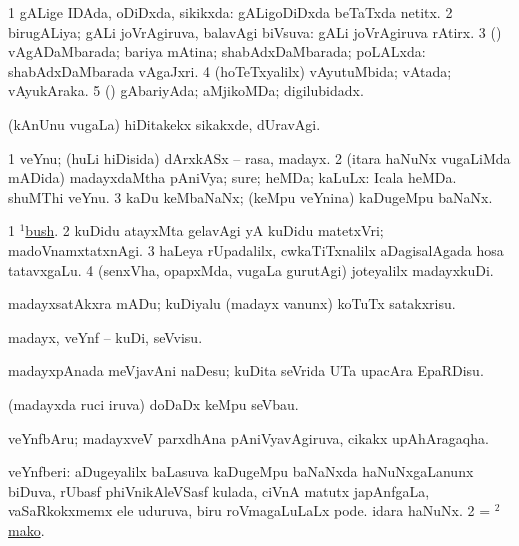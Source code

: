 \bentry 
{}
\gl{\gu} 
\bmng
\bnum
\num{1} gALige IDAda, oDiDxda, sikikxda:  gALigoDiDxda beTaTxda netitx. 
\num{2} birugALiya; gALi joVrAgiruva, balavAgi biVsuva:  gALi joVrAgiruva rAtirx. 
\num{3} (\AmA) vAgADaMbarada; bariya mAtina; shabAdxDaMbarada; poLALxda:  shabAdxDaMbarada vAgaJxri. 
\num{4} (hoTeTxyalilx) vAyutuMbida; vAtada; vAyukAraka. 
\num{5} (\AmA) gAbariyAda; aMjikoMDa; digilubidadx. 
\enum
\emng

\noindent
\gl{\pagu}
\bmng
{} (kAnUnu \mo vugaLa) hiDitakekx sikakxde, dUravAgi. 
\emng
\eentry

\bentry
{} 
\gl{\nA}
\expl{}
\bmng
\bnum
\num{1} veYnu; (huLi hiDisida) dArxkASx -- rasa, madayx. 
\num{2} (itara haNuNx \mo vugaLiMda mADida) madayxdaMtha pAniVya; sure; heMDa; kaLuLx:  Icala heMDa.  shuMThi veYnu. 
\num{3} kaDu keMbaNaNx; (keMpu veYnina) kaDugeMpu baNaNx. 
\enum
\emng

\noindent
\gl{\pagu}
\bmng
\bnum
\num{1}  \hyperref{kandict_b.pdf}{B}{bush(1) nuga(3)}{$^1$bush}. 
\num{2}  kuDidu atayxMta gelavAgi yA kuDidu matetxVri; madoVnamxtatxnAgi. 
\num{3}  haLeya rUpadalilx, cwkaTiTxnalilx aDagisalAgada hosa tatavxgaLu. 
\num{4}  (senxVha, opapxMda, \mo vugaLa gurutAgi) joteyalilx madayxkuDi. 
\enum
\emng
\eentry

\bentry
{}
\gl{\sakirx}
\expl{}
\bmng
madayxsatAkxra mADu; kuDiyalu (madayx \mo vanunx) koTuTx satakxrisu. 
\emng

\noindent 
\gl{\akirx}
\expl{}
\bmng
madayx, veYnf -- kuDi, seVvisu. 
\emng

\noindent 
\gl{\pagu}
\bmng
{} madayxpAnada meVjavAni naDesu; kuDita seVrida UTa upacAra EpaRDisu. 
\emng
\eentry

\bentry 
{}
\gl{\nA}
\bmng
(madayxda ruci iruva) doDaDx keMpu seVbau. 
\emng
\eentry

\bentry
{}
\gl{\nA}
\bmng
veYnfbAru; madayxveV parxdhAna pAniVyavAgiruva, cikakx upAhAragaqha. 
\emng
\eentry

\bentry
{}
\gl{\nA} 
\bmng
\bnum
{} veYnfberi: 
\banum
{} aDugeyalilx baLasuva kaDugeMpu baNaNxda haNuNxgaLanunx biDuva, rUbasf phiVnikAleVSasf kulada, ciVnA matutx japAnfgaLa, vaSaRkokxmemx ele uduruva, biru roVmagaLuLaLx pode. 
 idara haNuNx. 
\eanum
\numie
\num{2} = \hyperref{kandict_m.pdf}{M}{mako(2)}{$^2$mako}. 
\enum
\emng
\eentry

